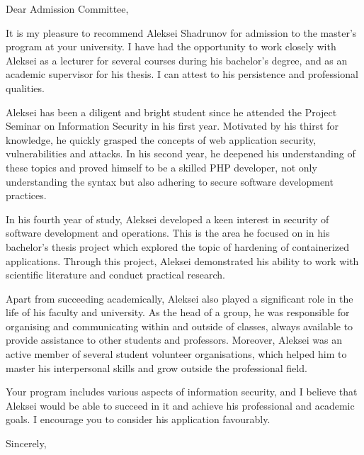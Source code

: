 \documentclass[12pt]{letter}
\begin{document}
\signature{V. V. Bashun \\ Assistant Professor \\ HSE University \\ \url{vbashun@hse.ru}}

\begin{letter}{}
\opening{Dear Admission Committee,}

It is my pleasure to recommend Aleksei Shadrunov for admission to the master's program at your university. I have had the opportunity to work closely with Aleksei as a lecturer for several courses during his bachelor's degree, and as an academic supervisor for his thesis. I can attest to his persistence and professional qualities.

Aleksei has been a diligent and bright student since he attended the Project Seminar on Information Security in his first year. Motivated by his thirst for knowledge, he quickly grasped the concepts of web application security, vulnerabilities and attacks. In his second year, he deepened his understanding of these topics and proved himself to be a skilled PHP developer, not only understanding the syntax but also adhering to secure software development practices.

In his fourth year of study, Aleksei developed a keen interest in security of software development and operations. This is the area he focused on in his bachelor's thesis project which explored the topic of hardening of containerized applications. Through this project, Aleksei demonstrated his ability to work with scientific literature and conduct practical research.

Apart from succeeding academically, Aleksei also played a significant role in the life of his faculty and university. As the head of a group, he was responsible for organising and communicating within and outside of classes, always available to provide assistance to other students and professors. Moreover, Aleksei was an active member of several student volunteer organisations, which helped him to master his interpersonal skills and grow outside the professional field.

Your program includes various aspects of information security, and I believe that Aleksei would be able to succeed in it and achieve his professional and academic goals. I encourage you to consider his application favourably.

\closing{Sincerely,}


\end{letter}
\end{document}
